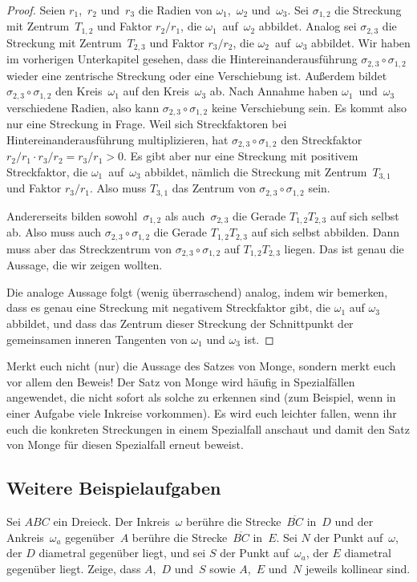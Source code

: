 \begin{proof}
	Seien $r_1$,~$r_2$ und~$r_3$ die Radien von $\omega_1$,~$\omega_2$ und~$\omega_3$. Sei $\sigma_{1,2}$ die Streckung mit Zentrum~$T_{1,2}$ und Faktor $r_2/r_1$, die $\omega_1$~auf~$\omega_2$ abbildet. Analog sei $\sigma_{2,3}$ die Streckung mit Zentrum~$T_{2,3}$ und Faktor $r_3/r_2$, die $\omega_2$~auf~$\omega_3$ abbildet. Wir haben im vorherigen Unterkapitel gesehen, dass die Hintereinanderausführung $\sigma_{2,3}\circ \sigma_{1,2}$ wieder eine zentrische Streckung oder eine Verschiebung ist. Außerdem bildet $\sigma_{2,3}\circ \sigma_{1,2}$ den Kreis~$\omega_1$ auf den Kreis~$\omega_3$ ab. Nach Annahme haben $\omega_1$~und~$\omega_3$ verschiedene Radien, also kann $\sigma_{2,3}\circ \sigma_{1,2}$ keine Verschiebung sein. Es kommt also nur eine Streckung in Frage. Weil sich Streckfaktoren bei Hintereinanderausführung multiplizieren, hat $\sigma_{2,3}\circ \sigma_{1,2}$ den Streckfaktor $r_2/r_1\cdot r_3/r_2=r_3/r_1>0$. Es gibt aber nur eine Streckung mit positivem Streckfaktor, die $\omega_1$~auf~$\omega_3$ abbildet, nämlich die Streckung mit Zentrum~$T_{3,1}$ und Faktor $r_3/r_1$. Also muss $T_{3,1}$ das Zentrum von $\sigma_{2,3}\circ \sigma_{1,2}$ sein.
	
	Andererseits bilden sowohl~$\sigma_{1,2}$ als auch~$\sigma_{2,3}$ die Gerade $T_{1,2}T_{2,3}$ auf sich selbst ab. Also muss auch $\sigma_{2,3}\circ \sigma_{1,2}$ die Gerade $T_{1,2}T_{2,3}$ auf sich selbst abbilden. Dann muss aber das Streckzentrum von $\sigma_{2,3}\circ \sigma_{1,2}$ auf $T_{1,2}T_{2,3}$ liegen. Das ist genau die Aussage, die wir zeigen wollten.
	
	Die analoge Aussage folgt (wenig überraschend) analog, indem wir bemerken, dass es genau eine Streckung mit negativem Streckfaktor gibt, die $\omega_1$ auf $\omega_3$ abbildet, und dass das Zentrum dieser Streckung der Schnittpunkt der gemeinsamen inneren Tangenten von $\omega_1$ und $\omega_3$ ist.
\end{proof}

Merkt euch nicht (nur) die Aussage des Satzes von Monge, sondern merkt euch vor allem den Beweis! Der Satz von Monge wird häufig in Spezialfällen angewendet, die nicht sofort als solche zu erkennen sind (zum Beispiel, wenn in einer Aufgabe viele Inkreise vorkommen). Es wird euch leichter fallen, wenn ihr euch die konkreten Streckungen in einem Spezialfall anschaut und damit den Satz von Monge für diesen Spezialfall erneut beweist.

\subsection*{Weitere Beispielaufgaben}
\begin{aufgabe*}\label{aufgabe:InAnkreis}
	Sei $ABC$ ein Dreieck. Der Inkreis~$\omega$ berühre die Strecke~$\overline{BC}$ in~$D$ und der Ankreis~$\omega_a$ gegenüber~$A$ berühre die Strecke~$\overline{BC}$ in~$E$. Sei $N$ der Punkt auf~$\omega$, der $D$ diametral gegenüber liegt, und sei $S$ der Punkt auf~$\omega_a$, der $E$ diametral gegenüber liegt. Zeige, dass $A$,~$D$ und~$S$ sowie $A$,~$E$ und~$N$ jeweils kollinear sind.
\end{aufgabe*}

